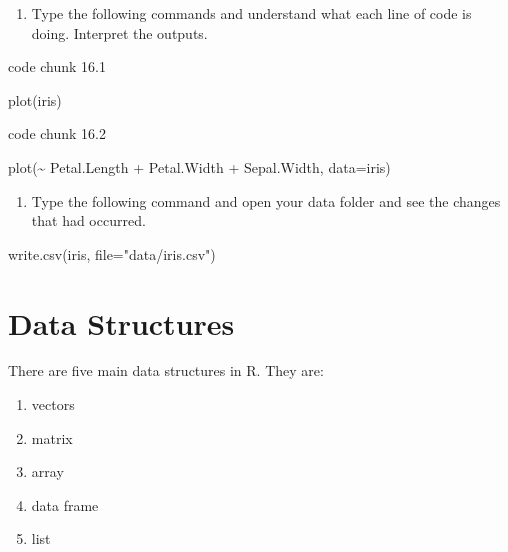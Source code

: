 \documentclass[
  letterpaper,
  DIV=11,
  numbers=noendperiod]{scrreprt}
\newenvironment{Shaded}{\begin{snugshade}}{\end{snugshade}}
\newcommand{\AttributeTok}[1]{\textcolor[rgb]{0.40,0.45,0.13}{#1}}
\newcommand{\FunctionTok}[1]{\textcolor[rgb]{0.28,0.35,0.67}{#1}}
\newcommand{\NormalTok}[1]{\textcolor[rgb]{0.00,0.23,0.31}{#1}}
\newcommand{\SpecialCharTok}[1]{\textcolor[rgb]{0.37,0.37,0.37}{#1}}
\newcommand{\StringTok}[1]{\textcolor[rgb]{0.13,0.47,0.30}{#1}}
\providecommand{\tightlist}{%
  \setlength{\itemsep}{0pt}\setlength{\parskip}{0pt}}\usepackage{longtable,booktabs,array}
\begin{document}
\begin{enumerate}
\def\labelenumi{\arabic{enumi}.}
\setcounter{enumi}{15}
\tightlist
\item
  Type the following commands and understand what each line of code is
  doing. Interpret the outputs.
\end{enumerate}

code chunk 16.1

\begin{Shaded}
\begin{Highlighting}[]
\FunctionTok{plot}\NormalTok{(iris)}
\end{Highlighting}
\end{Shaded}

code chunk 16.2

\begin{Shaded}
\begin{Highlighting}[]
\FunctionTok{plot}\NormalTok{(}\SpecialCharTok{\textasciitilde{}}\NormalTok{ Petal.Length }\SpecialCharTok{+}\NormalTok{ Petal.Width }\SpecialCharTok{+}\NormalTok{ Sepal.Width, }\AttributeTok{data=}\NormalTok{iris)}
\end{Highlighting}
\end{Shaded}

\begin{enumerate}
\def\labelenumi{\arabic{enumi}.}
\setcounter{enumi}{16}
\tightlist
\item
  Type the following command and open your data folder and see the
  changes that had occurred.
\end{enumerate}

\begin{Shaded}
\begin{Highlighting}[]
\FunctionTok{write.csv}\NormalTok{(iris, }\AttributeTok{file=}\StringTok{"data/iris.csv"}\NormalTok{)}
\end{Highlighting}
\end{Shaded}


\hypertarget{data-structures}{%
\chapter{Data Structures}\label{data-structures}}

There are five main data structures in R. They are:

\begin{enumerate}
\def\labelenumi{\arabic{enumi}.}
\item
  vectors
\item
  matrix
\item
  array
\item
  data frame
\item
  list
\end{enumerate}
\end{document}
